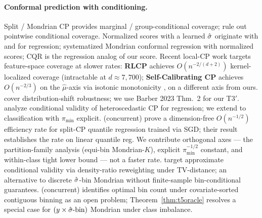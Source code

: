 
\paragraph{Conformal prediction with conditioning.}
Split / Mondrian CP \citep{vovk2005algorithmic,vovk2003mondrian,angelopoulos2022gentle} provides marginal / group-conditional coverage; \citet{barber2020limits} rule out pointwise conditional coverage. Normalized scores with a learned $\hat{\sigma}$ originate with \citet{papadopoulos2008normalized} and \citet{lei2018distribution} for regression; \citet{bostrom2020mondrian} systematized Mondrian conformal regression with normalized scores; CQR \citep{romano2019cqr} is the regression analog of our score. Recent local-CP work targets feature-space coverage at slower rates: \textbf{RLCP} \citep{hore2025rlcp} achieves $O(n^{-2/(d+2)})$ kernel-localized coverage (intractable at $d \approx 7{,}700$); \textbf{Self-Calibrating CP} \citep{vanderlaan2024sccp} achieves $O(n^{-2/3})$ on the $\hat\mu$-axis via isotonic monotonicity \citep{deng2021isotonic}, on a different axis from ours. \citet{tibshirani2019weighted,gibbs2021adaptive,barber2023exchangeability} cover distribution-shift robustness; we use Barber 2023 Thm.~2 for our T3$'$. \citet{dewolf2025conditional} analyze conditional validity of heteroscedastic CP for regression; we extend to classification with $\pi_{\min}$ explicit. \citet{yao2026nonasymp} (concurrent) prove a dimension-free $O(n^{-1/2})$ efficiency rate for split-CP quantile regression trained via SGD; their result establishes the rate on linear quantile reg. We contribute orthogonal axes — the partition-family analysis (equi-bin Mondrian-$K$), explicit $\pi_{\min}^{-1/2}$ constant, and within-class tight lower bound — not a faster rate. \citet{plassier2025cp2hpd} target approximate conditional validity via density-ratio reweighting under TV-distance; an alternative to discrete $\hat{\sigma}$-bin Mondrian without finite-sample bin-conditional guarantees. \citet{crps_binning2026} (concurrent) identifies optimal bin count under covariate-sorted contiguous binning as an open problem; Theorem~\ref{thm:t5oracle} resolves a special case for $(y \times \hat{\sigma}\text{-bin})$ Mondrian under class imbalance.

